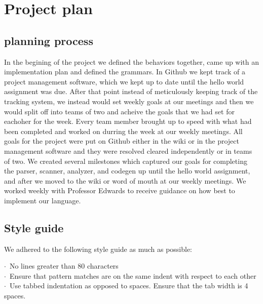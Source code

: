 \documentclass[./Report_main.tex]{subfiles}
\begin{document}


\chapter{Project plan}
\section{planning process}
In the begining of the project we defined the behaviors together, came up with an implementation plan and defined the grammars. In Github we kept track of a project management software, which we kept up to date until the hello world assignment was due. After that point instead of meticulously keeping track of the tracking system, we instead would set weekly goals at our meetings and then we would split off into teams of two and acheive the goals that we had set for eachoher for the week. Every team member brought up to speed with what had been completed and worked on durring the week at our weekly meetings. All goals for the project were put on Github either in the wiki or in the project management software and they were resolved cleared independently or in teams of two. We created several milestones which captured our goals for completing the parser, scanner, analyzer, and codegen up until the hello world assignment, and after we moved to the wiki or word of mouth at our weekly meetings. We worked weekly with Professor Edwards to receive guidance on how best to implement our language.
\section{Style guide}
We adhered to the following style guide as much as possible:\\
\begin{adjustwidth}{1cm}{}
$ \cdot $\ No lines greater than 80 characters\\
$ \cdot $\ Ensure that pattern matches are on the same indent with respect to each other\\
$\cdot $\ Use tabbed indentation as opposed to spaces. Ensure that the tab width is 4 spaces.
\end{adjustwidth}
\end{document}
